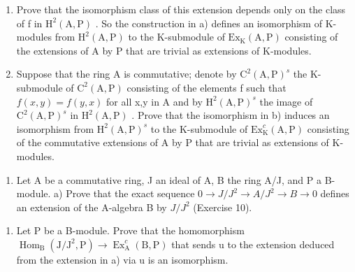 \begin{enumerate}
\def\labelenumi{\alph{enumi})}
\setcounter{enumi}{1}
\item
  Prove that the isomorphism class of this extension depends only on the class of f in \(\mathrm{H}^{2}(\mathrm{A},\mathrm{P})\) . So the construction in a) defines an isomorphism of K-modules from \(\mathrm{H}^{2}(\mathrm{A},\mathrm{P})\) to the K-submodule of \(\mathrm{Ex}_{\mathrm{K}}(\mathrm{A},\mathrm{P})\) consisting of the extensions of A by P that are trivial as extensions of K-modules.
\item
  Suppose that the ring A is commutative; denote by \(\mathrm{C}^{2}(\mathrm{A},\mathrm{P})^{s}\) the K-submodule of \(\mathrm{C}^{2}(\mathrm{A},\mathrm{P})\) consisting of the elements f such that \(f(x,y)=f(y,x)\) for all x,y in A and by \(\mathrm{H}^{2}(\mathrm{A},\mathrm{P})^{s}\) the image of \(\mathrm{C}^{2}(\mathrm{A},\mathrm{P})^{s}\) in \(\mathrm{H}^{2}(\mathrm{A},\mathrm{P})\) . Prove that the isomorphism in b) induces an isomorphism from \(\mathrm{H}^{2}(\mathrm{A},\mathrm{P})^{s}\) to the K-submodule of \(\mathrm{Ex}_{\mathrm{K}}^{c}(\mathrm{A},\mathrm{P})\) consisting of the commutative extensions of A by P that are trivial as extensions of K-modules.
\end{enumerate}

\begin{enumerate}
\def\labelenumi{\arabic{enumi})}
\setcounter{enumi}{11}
\tightlist
\item
  Let A be a commutative ring, J an ideal of A, B the ring A/J, and P a B-module. a) Prove that the exact sequence \(0 \rightarrow J/J^{2} \rightarrow A/J^{2} \rightarrow B \rightarrow 0\) defines an extension of the A-algebra B by \(J/J^{2}\) (Exercise 10).
\end{enumerate}

\begin{enumerate}
\def\labelenumi{\alph{enumi})}
\setcounter{enumi}{1}
\tightlist
\item
  Let P be a B-module. Prove that the homomorphism \(\operatorname{Hom}_{\mathrm{B}}(\mathrm{J}/\mathrm{J}^{2},\mathrm{P}) \to \operatorname{Ex}_{\mathrm{A}}^{c}(\mathrm{B},\mathrm{P})\) that sends u to the extension deduced from the extension in a) via u is an isomorphism.
\end{enumerate}


